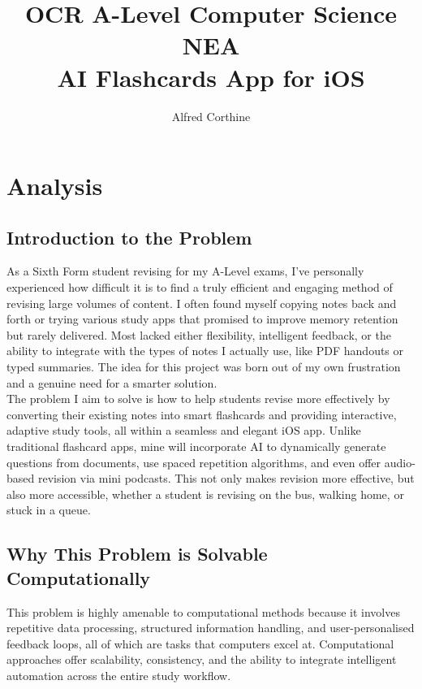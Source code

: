 \documentclass[a4paper,12pt]{article}
\title{\textbf{OCR A-Level Computer Science NEA} \\[0.5em] \large AI Flashcards App for iOS}
\author{Alfred Corthine}
\date{\vspace{-5ex}}
\begin{document}
\maketitle
\thispagestyle{empty}
\newpage

\tableofcontents
\newpage

\section{Analysis}

\subsection{Introduction to the Problem}
As a Sixth Form student revising for my A-Level exams, I’ve personally experienced how difficult it is to find a truly efficient and engaging method of revising large volumes of content. I often found myself copying notes back and forth or trying various study apps that promised to improve memory retention but rarely delivered. Most lacked either flexibility, intelligent feedback, or the ability to integrate with the types of notes I actually use, like PDF handouts or typed summaries. The idea for this project was born out of my own frustration and a genuine need for a smarter solution.\\

The problem I aim to solve is how to help students revise more effectively by converting their existing notes into smart flashcards and providing interactive, adaptive study tools, all within a seamless and elegant iOS app. Unlike traditional flashcard apps, mine will incorporate AI to dynamically generate questions from documents, use spaced repetition algorithms, and even offer audio-based revision via mini podcasts. This not only makes revision more effective, but also more accessible, whether a student is revising on the bus, walking home, or stuck in a queue.

\subsection{Why This Problem is Solvable Computationally}
This problem is highly amenable to computational methods because it involves repetitive data processing, structured information handling, and user-personalised feedback loops, all of which are tasks that computers excel at. Computational approaches offer scalability, consistency, and the ability to integrate intelligent automation across the entire study workflow.\\
\end{document}
